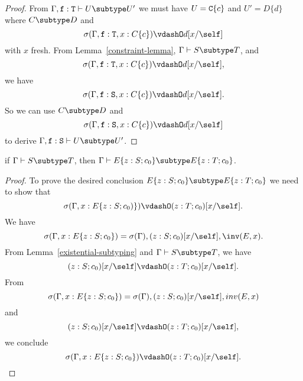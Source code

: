 \begin{proof}
From $\Gamma, {\tt f}: {\tt T} \vdash U \subtype U'$
we must have $U = {\tt C}\{c\}$ and $U' = D\{d\}$
where
$C \subtype D$
and 
$$\sigma(\Gamma, {\tt f}: {\tt T}, x: C\{c\}) \vdashO d[x/\self]$$
with $x$ fresh.
From Lemma~\ref{constraint-lemma},
$\Gamma \vdash S \subtype T$,
and
$$\sigma(\Gamma, {\tt f}: {\tt T}, x: C\{c\}) \vdashO d[x/\self],$$
we have
$$\sigma(\Gamma, {\tt f}: {\tt S}, x: C\{c\}) \vdashO d[x/\self].$$
So we can use 
$C \subtype D$
and
$$\sigma(\Gamma, {\tt f}: {\tt S}, x: C\{c\}) \vdashO d[x/\self]$$
to derive 
$\Gamma, {\tt f}: {\tt S} \vdash U \subtype U'$.
\end{proof}

\begin{lemma}
\label{subtyping-in-existential-lemma} %
if   $\Gamma \vdash S \subtype T$,
then $\Gamma \vdash E\{z: S; c_0\} \subtype E\{z: T; c_0\}$.
\end{lemma}

\begin{proof}
To prove the desired conclusion $E\{z: S; c_0\} \subtype E\{z: T; c_0\}$ 
we need to show that
$$\sigma(\Gamma, x: E\{z: S; c_0)\}) \vdashO (z: T; c_0)[x/\self].$$
%
We have 
$$\sigma(\Gamma, x: E\{z: S; c_0\}) = 
 \sigma(\Gamma), (z: S; c_0)[x/\self], \inv(E,x).$$
From Lemma~\ref{existential-subtyping} and
$\Gamma \vdash S \subtype T$, 
we have
$$(z:S; c_0)[x/\self] \vdashO (z:T; c_0)[x/\self].$$
From $$\sigma(\Gamma, x: E\{z: S; c_0\}) =
 \sigma(\Gamma), (z: S; c_0)[x/\self], inv(E,x)$$
and
$$(z:S; c_0)[x/\self] \vdashO (z:T; c_0)[x/\self],$$
we conclude 
$$\sigma(\Gamma, x: E\{z: S; c_0\}) \vdashO (z: T; c_0)[x/\self].$$
\end{proof}

